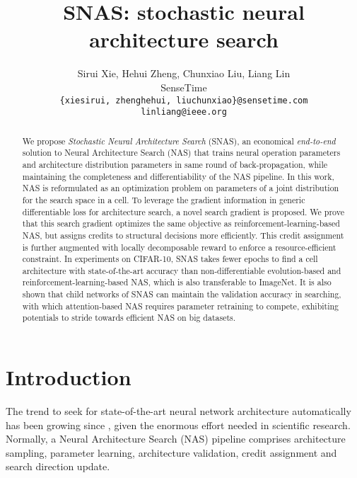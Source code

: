 \documentclass{article} \usepackage{iclr2019_conference,times}
\title{SNAS: stochastic neural architecture search}
\author{Sirui Xie, Hehui Zheng, Chunxiao Liu, Liang Lin\\
SenseTime \\
\texttt{\{xiesirui, zhenghehui, liuchunxiao\}@sensetime.com} \\
\texttt{linliang@ieee.org}
}
\newcommand{\zh}{\color{black}}
\begin{document}
\maketitle

\begin{abstract}
    We propose \textit{Stochastic Neural Architecture Search} (SNAS), an economical \textit{end-to-end} solution to Neural Architecture Search (NAS) that trains neural operation parameters and architecture distribution parameters in same round of back-propagation, while maintaining the completeness and {\zh differentiability} of the NAS pipeline. In this work, NAS is reformulated as an optimization problem on parameters of a joint distribution for the search space in a cell. To leverage the gradient information in generic differentiable loss for architecture search, a novel search gradient is proposed. We prove that this search gradient optimizes the same objective as reinforcement-learning-based NAS, but assigns credits to structural decisions more efficiently. This credit assignment is further augmented with locally decomposable reward to enforce a resource-efficient constraint. In experiments on CIFAR-10, SNAS takes {\zh fewer} epochs to find a cell architecture with state-of-the-art accuracy than non-differentiable evolution-based and reinforcement-learning-based NAS, which is also transferable to ImageNet. It is also shown that child networks of SNAS can maintain the validation accuracy in searching, with which attention-based NAS requires parameter retraining to compete, exhibiting potentials to stride towards efficient NAS on big datasets. 
\end{abstract}

\section{Introduction}
The trend to seek for state-of-the-art neural network architecture automatically has been growing since \citet{zoph2016neural}, given the enormous effort needed in scientific research. Normally, a Neural Architecture Search (NAS) pipeline comprises architecture sampling, parameter learning, architecture validation, credit assignment and search direction update. 
\end{document}
